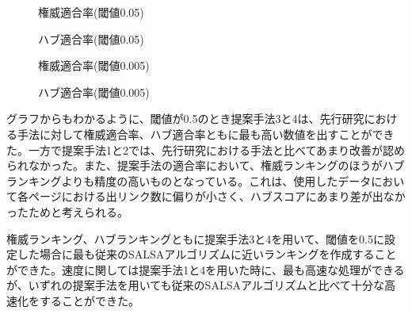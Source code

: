 \documentclass[a4paper,11pt]{jreport}
\begin{document}
\begin{figure}[htbp]
\begin{center}
\end{center}
\caption{権威適合率(閾値0.05)}
\label{figure:sample}
\end{figure}

\begin{figure}[htbp]
\begin{center}
\end{center}
\caption{ハブ適合率(閾値0.05)}
\label{figure:sample}
\end{figure}

\begin{figure}[htbp]
\begin{center}
\end{center}
\caption{権威適合率(閾値0.005)}
\label{figure:sample}
\end{figure}

\begin{figure}[htbp]
\begin{center}
\end{center}
\caption{ハブ適合率(閾値0.005)}
\label{figure:sample}
\end{figure}

\clearpage

グラフからもわかるように、閾値が0.5のとき提案手法3と4は、先行研究における手法に対して権威適合率、ハブ適合率ともに最も高い数値を出すことができた。一方で提案手法1と2では、先行研究における手法と比べてあまり改善が認められなかった。また、提案手法の適合率において、権威ランキングのほうがハブランキングよりも精度の高いものとなっている。これは、使用したデータにおいて各ページにおける出リンク数に偏りが小さく、ハブスコアにあまり差が出なかったためと考えられる。

権威ランキング、ハブランキングともに提案手法3と4を用いて、閾値を0.5に設定した場合に最も従来のSALSAアルゴリズムに近いランキングを作成することができた。速度に関しては提案手法1と4を用いた時に、最も高速な処理ができるが、いずれの提案手法を用いても従来のSALSAアルゴリズムと比べて十分な高速化をすることができた。
\end{document}
